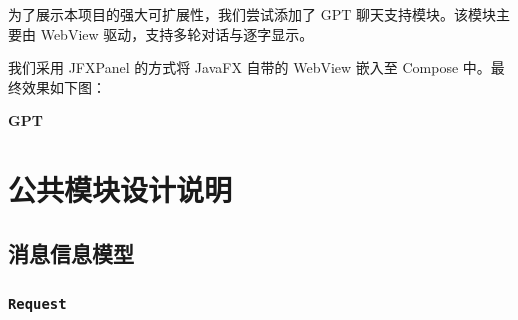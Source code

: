 \documentclass{article}
\begin{document}
为了展示本项目的强大可扩展性，我们尝试添加了 GPT 聊天支持模块。该模块主要由 WebView 驱动，支持多轮对话与逐字显示。

我们采用 JFXPanel 的方式将 JavaFX 自带的 WebView 嵌入至 Compose 中。最终效果如下图：

\begin{center}
\textbf{GPT}
\end{center}

\section{公共模块设计说明}
\subsection{消息信息模型}

\subsubsection{\texttt{Request}}

\begin{table}[H]
  \centering
\end{table}
\end{document}
